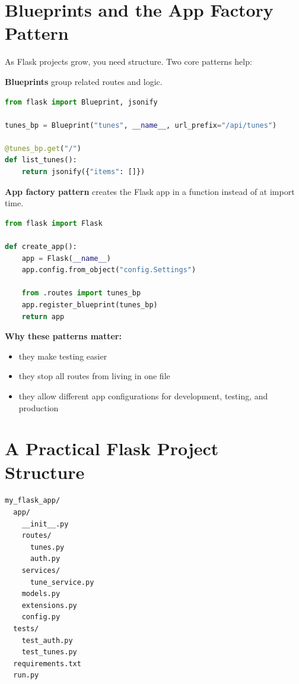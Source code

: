 \documentclass[12pt, a4paper, oneside]{book}
\begin{document}
\section{Blueprints and the App Factory Pattern}

As Flask projects grow, you need structure. Two core patterns help:

\textbf{Blueprints} group related routes and logic.
\begin{lstlisting}[language=Python, caption={Flask Blueprint example}]
from flask import Blueprint, jsonify

tunes_bp = Blueprint("tunes", __name__, url_prefix="/api/tunes")

@tunes_bp.get("/")
def list_tunes():
    return jsonify({"items": []})
\end{lstlisting}

\textbf{App factory pattern} creates the Flask app in a function instead of at import time.
\begin{lstlisting}[language=Python, caption={Flask app factory example}]
from flask import Flask

def create_app():
    app = Flask(__name__)
    app.config.from_object("config.Settings")

    from .routes import tunes_bp
    app.register_blueprint(tunes_bp)
    return app
\end{lstlisting}

\textbf{Why these patterns matter:}
\begin{itemize}[leftmargin=2em]
    \item they make testing easier
    \item they stop all routes from living in one file
    \item they allow different app configurations for development, testing, and production
\end{itemize}

\section{A Practical Flask Project Structure}

\begin{lstlisting}[language=bash, caption={A maintainable Flask layout}]
my_flask_app/
  app/
    __init__.py
    routes/
      tunes.py
      auth.py
    services/
      tune_service.py
    models.py
    extensions.py
    config.py
  tests/
    test_auth.py
    test_tunes.py
  requirements.txt
  run.py
\end{lstlisting}
\end{document}
